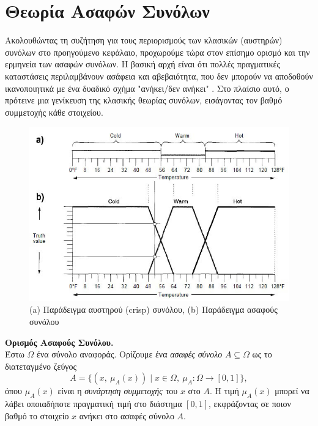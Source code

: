 \section{Θεωρία Ασαφών Συνόλων}
Ακολουθώντας τη συζήτηση για τους περιορισμούς των κλασικών (αυστηρών) συνόλων στο προηγούμενο κεφάλαιο, προχωρούμε τώρα στον επίσημο ορισμό και την ερμηνεία των ασαφών συνόλων. Η βασική αρχή είναι ότι πολλές πραγματικές καταστάσεις περιλαμβάνουν ασάφεια και αβεβαιότητα, που δεν μπορούν να αποδοθούν ικανοποιητικά με ένα δυαδικό σχήμα "ανήκει/δεν ανήκει" \cite{Zadeh1965,KlirYuan}. Στο πλαίσιο αυτό, ο  πρότεινε μια γενίκευση της κλασικής θεωρίας συνόλων, εισάγοντας τον βαθμό συμμετοχής κάθε στοιχείου.

\begin{figure}[h!] \includegraphics[scale=0.7]{images/fuzzy_logic1.jpg} \centering \caption{(\textlatin{a}) Παράδειγμα αυστηρού (\textlatin{crisp}) συνόλου, (\textlatin{b}) Παράδειγμα ασαφούς συνόλου} \label{char_fun1} \end{figure}

\medskip

\begin{definition}
	\label{def:fuzzyset}
	\textbf{Ορισμός Ασαφούς Συνόλου.}\\
	Έστω \(\Omega\) ένα σύνολο αναφοράς. Ορίζουμε ένα \emph{ασαφές σύνολο} \(A \subseteq \Omega\) ως το διατεταγμένο ζεύγος
	\begin{equation}
	\label{eq:1}
	A = \{(x,\ \mu_{A}(x)) \mid x \in \Omega,\ \mu_{A}: \Omega \rightarrow [0,1]\},
	\end{equation}
	όπου \(\mu_{A}(x)\) είναι η \emph{συνάρτηση συμμετοχής} του \(x\) στο \(A\). Η τιμή \(\mu_{A}(x)\) μπορεί να λάβει οποιαδήποτε πραγματική τιμή στο διάστημα \([0,1]\), εκφράζοντας σε ποιον βαθμό το στοιχείο \(x\) ανήκει στο ασαφές σύνολο \(A\).
\end{definition}


